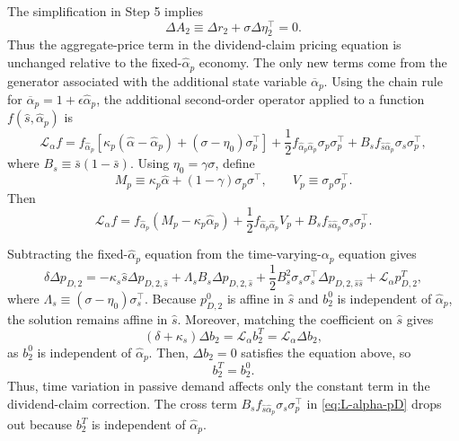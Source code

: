 The simplification in Step 5 implies
\begin{equation}
    \Delta A_2
    \equiv \Delta r_2+\sigma\Delta\eta_2^\top=0.
\end{equation}
Thus the aggregate-price term in the dividend-claim pricing equation is unchanged relative to the fixed-$\hat{\alpha}_p$ economy.
The only new terms come from the generator associated with the additional state variable $\overline{\alpha}_p$.
Using the chain rule for $\overline{\alpha}_p=1+\epsilon\hat{\alpha}_p$, the additional second-order operator applied to a function $f(\hat{s},\hat{\alpha}_p)$ is
\begin{equation}\label{eq:L-alpha-pD}
    \mathcal{L}_{\alpha}f
    =f_{\hat{\alpha}_p}\left[\kappa_p(\hat{\alpha}-\hat{\alpha}_p)+(\sigma-\eta_0)\sigma_p^\top\right]
    +\frac{1}{2}f_{\hat{\alpha}_p\hat{\alpha}_p}\sigma_p\sigma_p^\top
    +B_s f_{\hat{s}\hat{\alpha}_p}\sigma_s\sigma_p^\top,
\end{equation}
where $B_s\equiv\bar{s}(1-\bar{s})$.
Using $\eta_0=\gamma\sigma$, define
\begin{equation}
    M_p\equiv\kappa_p\hat{\alpha}+(1-\gamma)\sigma_p\sigma^\top,
    \qquad
    V_p\equiv\sigma_p\sigma_p^\top.
\end{equation}
Then
\begin{equation}
    \mathcal{L}_{\alpha}f
    =f_{\hat{\alpha}_p}(M_p-\kappa_p\hat{\alpha}_p)
    +\frac{1}{2}f_{\hat{\alpha}_p\hat{\alpha}_p}V_p
    +B_s f_{\hat{s}\hat{\alpha}_p}\sigma_s\sigma_p^\top.
\end{equation}

Subtracting the fixed-$\hat{\alpha}_p$ equation from the time-varying-$\alpha_p$ equation gives
\begin{equation}\label{eq:delta-pD2-alpha-operator}
    \delta\Delta p_{D,2}
    =-\kappa_s\hat{s}\Delta p_{D,2,\hat{s}}
    +\Lambda_s B_s\Delta p_{D,2,\hat{s}}
    +\frac{1}{2}B_s^2\sigma_s\sigma_s^\top\Delta p_{D,2,\hat{s}\hat{s}}
    +\mathcal{L}_{\alpha}p_{D,2}^{T},
\end{equation}
where $\Lambda_s\equiv(\sigma-\eta_0)\sigma_s^\top$.
Because $p_{D,2}^{0}$ is affine in $\hat{s}$ and $b_2^{0}$ is independent of $\hat{\alpha}_p$, the solution remains affine in $\hat{s}$.
Moreover, matching the coefficient on $\hat{s}$ gives
\begin{equation}
    (\delta+\kappa_s)\Delta b_2=\mathcal{L}_{\alpha}b_2^{T} = \mathcal{L}_{\alpha}\Delta b_2,
\end{equation}
as $b_2^0 $ is independent of $\hat{\alpha}_p$.
Then, $\Delta b_2 = 0$ satisfies the equation above, so
\begin{equation}\label{eq:pD-b2-timevarying-alpha}
    b_2^{T}=b_2^{0}.
\end{equation}
Thus, time variation in passive demand affects only the constant term in the dividend-claim correction.
The cross term $B_s f_{\hat{s}\hat{\alpha}_p}\sigma_s\sigma_p^\top$ in \eqref{eq:L-alpha-pD} drops out because $b_2^{T}$ is independent of $\hat{\alpha}_p$.

